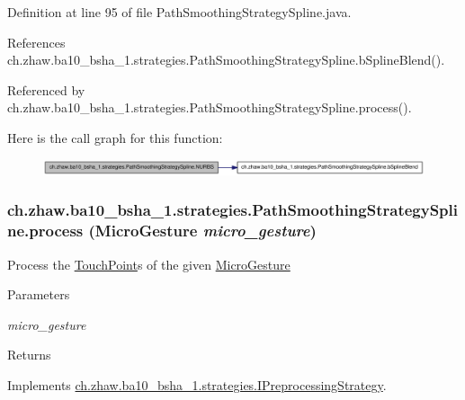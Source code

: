 Definition at line 95 of file PathSmoothingStrategySpline.java.

References ch.zhaw.ba10\_\-bsha\_\-1.strategies.PathSmoothingStrategySpline.bSplineBlend().

Referenced by ch.zhaw.ba10\_\-bsha\_\-1.strategies.PathSmoothingStrategySpline.process().

Here is the call graph for this function:\nopagebreak
\begin{figure}[H]
\begin{center}
\leavevmode
\includegraphics[width=380pt]{classch_1_1zhaw_1_1ba10__bsha__1_1_1strategies_1_1PathSmoothingStrategySpline_af58eb333b4b6ee0e1808b1bd68cbca69_cgraph}
\end{center}
\end{figure}
\hypertarget{classch_1_1zhaw_1_1ba10__bsha__1_1_1strategies_1_1PathSmoothingStrategySpline_ad3e6346b66b88e50ce7c985ff3d99644}{
\subsubsection[{process}]{ ch.zhaw.ba10\_\-bsha\_\-1.strategies.PathSmoothingStrategySpline.process ({\bf MicroGesture} {\em micro\_\-gesture})}}
\label{classch_1_1zhaw_1_1ba10__bsha__1_1_1strategies_1_1PathSmoothingStrategySpline_ad3e6346b66b88e50ce7c985ff3d99644}
Process the \hyperlink{classch_1_1zhaw_1_1ba10__bsha__1_1_1TouchPoint}{TouchPoint}s of the given \hyperlink{}{MicroGesture}


\begin{DoxyParams}{Parameters}
\item[{\em micro\_\-gesture}]\end{DoxyParams}
\begin{DoxyReturn}{Returns}

\end{DoxyReturn}


Implements \hyperlink{interfacech_1_1zhaw_1_1ba10__bsha__1_1_1strategies_1_1IPreprocessingStrategy_a3e3885dce8fda7b79dc514078f11ad62}{ch.zhaw.ba10\_\-bsha\_\-1.strategies.IPreprocessingStrategy}.

